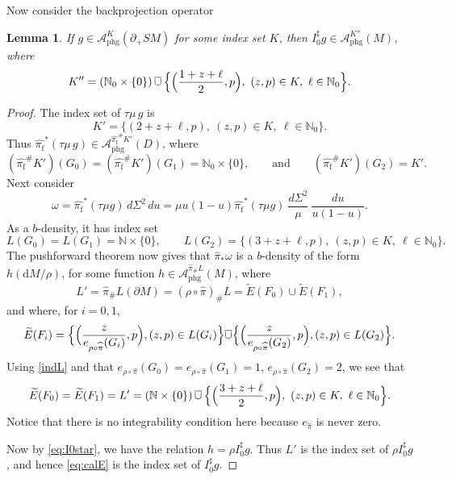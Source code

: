 \documentclass[11pt]{article}
\theoremstyle{plain}
\newtheorem{Lemma}[Theorem]{Lemma}
\theoremstyle{definition}
\theoremstyle{remark}
\def\Nm{{\mathbb{N}}}
\def\A{\mathcal{A}}
\newcommand{\adj}{I_0^\sharp}
\newcommand{\hpi}{\widehat{\pi}}
\newcommand {\dM}{\mathrm{d}M}
\newcommand{\phg}{\mathrm{phg}}
\newcommand{\foot}{{\pi_{\mathrm f}}}
\newcommand{\hF}{\widehat{\foot}}
\begin{document}
Now consider the backprojection operator
\begin{Lemma}\label{lem:I0star} If $g\in \A_{\phg}^K (\partial_+ SM)$ for some index set $K$, then $\adj g \in \A_{\phg}^{K''} (M)$, where\vspace*{-3pt}
\begin{equation}
K'' = (\Nm_0\times \{0\}) \, \overline{\cup} \, \Bigl\{ \Bigl(\frac{1+z+\ell}{2}, p\Bigr),\ (z,p)\in K,\ \ell\in \Nm_0 \Bigr\}.
\label{eq:calE}
\end{equation}
\end{Lemma}

\begin{proof}
The index set of $\tau\mu \, g$ is\vspace*{-3pt}
\begin{equation*}
K' = \{ (2 + z +\ell, p),\ (z,p)\in K,\ \ell\in \Nm_0 \}.
\end{equation*}
Thus $\hF^* (\tau\mu \, g) \in \A_{\phg}^{\hF^\# K'}(D)$, where\vspace*{-3pt}
\begin{equation*}
(\hF^\# K')(G_0) = (\hF^\# K')(G_1) = \Nm_0 \times \{0\}, \qquad\text{and}\qquad (\hF^\# K')(G_2) = K'.
\end{equation*}
Next consider\vspace*{-3pt}
\begin{equation*}
\omega = \hF^* (\tau\mu g)\,d\Sigma^2\,du = \mu u(1-u) \hF^* (\tau\mu g)\ \frac{d\Sigma^2}{\mu}\ \frac{du}{u(1-u)}.
\end{equation*}
As a $b$-density, it has index set
\begin{equation}
L(G_0) = L(G_1) = \Nm \times \{0\}, \qquad L(G_2) = \{ (3 + z+\ell,p),\ (z,p)\in K,\ \ell\in \Nm_0 \}.
\label{indL}
\end{equation}
The pushforward theorem now gives that $\hpi_* \omega$ is a $b$-density of the form $h (\dM/\rho)$, for some function $h\in \A_{\phg}^{\hpi_\# L} (M)$, where
\begin{equation*}
L' = \hpi_\# L (\partial M) = (\rho\circ \hpi)_\# L = \widetilde{E}(F_0) \cup \widetilde {E} (F_1),
\end{equation*}
and where, for $i=0,1$,
\begin{equation*}
\widetilde{E}(F_i) = \Bigl\{ \Bigl(\frac{z}{e_{\rho\circ\hpi}(G_i)}, p \Bigr), (z,p)\in L(G_i) \Bigr\} \overline{\cup} \Bigl\{ \Bigl(\frac{z}{e_{\rho\circ\hpi}(G_2)}, p \Bigr), (z,p)\in L(G_2) \Bigr\}.
\end{equation*}
Using \eqref{indL} and that $e_{\rho\circ\hpi}(G_0) = e_{\rho\circ\hpi}(G_1) = 1$, $e_{\rho \circ \hpi}(G_2) = 2$, we see that
\begin{equation*}
\widetilde{E}(F_0) = \widetilde{E}(F_1) = L' = (\Nm\times \{0\}) \, \overline{\cup} \, \Bigl\{ \Bigl(\frac{3+z +\ell}{2}, p \Bigr),\ (z,p)\in K,\ \ell\in\Nm_0 \Bigr\}.
\end{equation*}
Notice that there is no integrability condition here because $e_{\hpi}$ is never zero.

Now by \eqref{eq:I0star}, we have the relation $h = \rho \adj g$. Thus $L'$ is the index set of $\rho \adj g$, and hence \eqref{eq:calE} is the index set of $\adj g$.
\end{proof}
\end{document}
